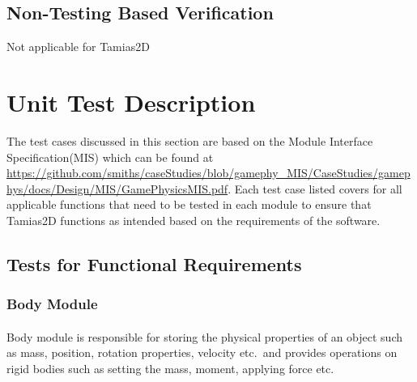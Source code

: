 \documentclass[12pt, titlepage]{article}
\newcommand{\progname}{Tamias2D}
\begin{document}
\subsection{Non-Testing Based Verification}

Not applicable for \progname


\section{Unit Test Description}

The test cases discussed in this section are based on the Module Interface
Specification(MIS) which can be found at
\url{https://github.com/smiths/caseStudies/blob/gamephy_MIS/CaseStudies/gamephys/docs/Design/MIS/GamePhysicsMIS.pdf}. Each
test case listed covers for all applicable functions that need to be tested in
each module to ensure that \progname{} functions as intended based on the
requirements of the software.
	
\subsection{Tests for Functional Requirements}

\subsubsection{Body Module}
		
\paragraph{}
Body module is responsible for storing the physical properties of an object such
as mass, position, rotation properties, velocity etc.\ and provides operations on rigid bodies such as setting the mass, moment, applying force
etc.\ 
\end{document}
